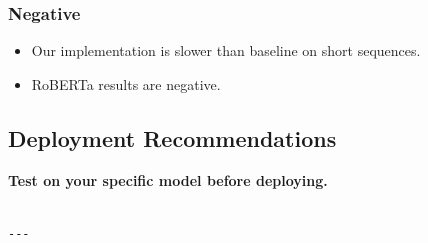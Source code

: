 \subsubsection{Negative}

\begin{itemize}
\item Our implementation is slower than baseline on short sequences.
\item RoBERTa results are negative.

\end{itemize}
\subsection{Deployment Recommendations}

\textbf{Test on your specific model before deploying.}
\begin{lstlisting}

---
\end{lstlisting}